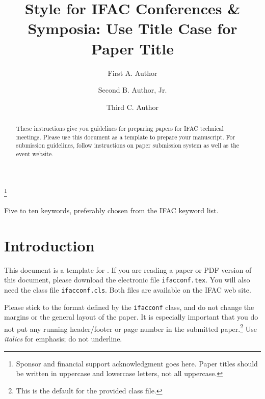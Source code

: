 \documentclass{ifacconf}
\begin{document}
\begin{frontmatter}

\title{Style for IFAC Conferences \& Symposia: Use Title Case for
  Paper Title} 

\thanks[footnoteinfo]{Sponsor and financial support acknowledgment
goes here. Paper titles should be written in uppercase and lowercase
letters, not all uppercase.}

\author[First]{First A. Author} 
\author[Second]{Second B. Author, Jr.} 
\author[Third]{Third C. Author}

\address[First]{National Institute of Standards and Technology, 
   Boulder, CO 80305 USA (e-mail: author@ boulder.nist.gov).}
\address[Second]{Colorado State University, 
   Fort Collins, CO 80523 USA (e-mail: author@lamar. colostate.edu)}
\address[Third]{Electrical Engineering Department, 
   Seoul National University, Seoul, Korea, (e-mail: author@snu.ac.kr)}

\begin{abstract}                %
These instructions give you guidelines for preparing papers for IFAC
technical meetings. Please use this document as a template to prepare
your manuscript. For submission guidelines, follow instructions on
paper submission system as well as the event website.
\end{abstract}

\begin{keyword}
Five to ten keywords, preferably chosen from the IFAC keyword list.
\end{keyword}

\end{frontmatter}

\section{Introduction}
This document is a template for \LaTeXe. If you are reading a paper or
PDF version of this document, please download the electronic file
\texttt{ifacconf.tex}. You will also need the class file
\texttt{ifacconf.cls}. Both files are available on the IFAC web site.

Please stick to the format defined by the \texttt{ifacconf} class, and
do not change the margins or the general layout of the paper. It
is especially important that you do not put any running header/footer
or page number in the submitted paper.\footnote{
This is the default for the provided class file.}
Use \emph{italics} for emphasis; do not underline.
\end{document}
